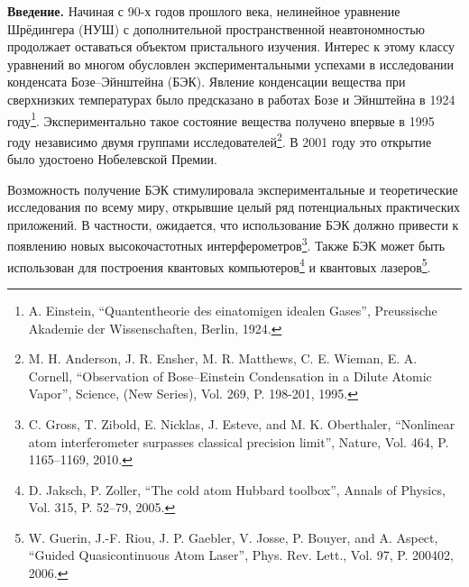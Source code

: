 \documentclass[candidate, href, colorlinks]{disser}
\begin{document}
\textbf{Введение.}
Начиная с 90-х годов прошлого века, нелинейное уравнение Шрёдингера (НУШ) с дополнительной пространственной неавтономностью продолжает оставаться объектом пристального изучения.
Интерес к этому классу уравнений во многом обусловлен экспериментальными успехами в исследовании конденсата Бозе--Эйнштейна (БЭК).
Явление конденсации вещества при сверхнизких температурах было предсказано в работах Бозе и Эйнштейна в 1924 году\footnote{A. Einstein, ``Quantentheorie des einatomigen idealen Gases'', Preussische Akademie der Wissenschaften, Berlin, 1924.}.
Экспериментально такое состояние вещества получено впервые в 1995 году независимо двумя группами исследователей\footnote{M. H. Anderson, J. R. Ensher, M. R. Matthews, C. E. Wieman, E. A. Cornell, ``Observation of Bose--Einstein Condensation in a Dilute Atomic Vapor'', Science, (New Series), Vol. 269, P. 198-201, 1995.}.
В 2001 году это открытие было удостоено Нобелевской Премии.

Возможность получение БЭК стимулировала экспериментальные и теоретические исследования по всему миру, открывшие целый ряд потенциальных практических приложений.
В частности, ожидается, что использование БЭК должно привести к появлению новых высокочастотных интерферометров\footnote{C. Gross, T. Zibold, E. Nicklas, J. Esteve, and M. K. Oberthaler, ``Nonlinear atom interferometer surpasses classical precision limit'', Nature, Vol. 464, P. 1165--1169, 2010.}.
Также БЭК может быть использован для построения квантовых компьютеров\footnote{D. Jaksch, P. Zoller, ``The cold atom Hubbard toolbox'', Annals of Physics, Vol. 315, P. 52--79, 2005.} и квантовых лазеров\footnote{W. Guerin, J.-F. Riou, J. P. Gaebler, V. Josse, P. Bouyer, and A. Aspect, ``Guided Quasicontinuous Atom Laser'', Phys. Rev. Lett., Vol. 97, P. 200402, 2006.}.
\end{document}
